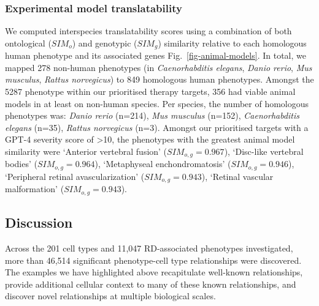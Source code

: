 \documentclass[
sn-nature
]{sn-jnl}
\begin{document}
\subsubsection{Experimental model
translatability}\label{experimental-model-translatability}

We computed interspecies translatability scores using a combination of
both ontological (\(SIM_{o}\)) and genotypic (\(SIM_{g}\)) similarity
relative to each homologous human phenotype and its associated genes
Fig.~\ref{fig-animal-models}. In total, we mapped 278 non-human
phenotypes (in \emph{Caenorhabditis elegans}, \emph{Danio rerio},
\emph{Mus musculus}, \emph{Rattus norvegicus}) to 849 homologous human
phenotypes. Amongst the 5287 phenotype within our prioritised therapy
targets, 356 had viable animal models in at least on non-human species.
Per species, the number of homologous phenotypes was: \emph{Danio rerio}
(n=214), \emph{Mus musculus} (n=152), \emph{Caenorhabditis elegans}
(n=35), \emph{Rattus norvegicus} (n=3). Amongst our prioritised targets
with a GPT-4 severity score of \textgreater10, the phenotypes with the
greatest animal model similarity were `Anterior vertebral fusion'
(\(SIM_{o,g}=0.967\)), `Disc-like vertebral bodies'
(\(SIM_{o,g}=0.964\)), `Metaphyseal enchondromatosis'
(\(SIM_{o,g}=0.946\)), `Peripheral retinal avascularization'
(\(SIM_{o,g}=0.943\)), `Retinal vascular malformation'
(\(SIM_{o,g}=0.943\)).

\subsection{Discussion}\label{sec-discussion}

Across the 201 cell types and 11,047 RD-associated phenotypes
investigated, more than 46,514 significant phenotype-cell type
relationships were discovered. The examples we have highlighted above
recapitulate well-known relationships, provide additional cellular
context to many of these known relationships, and discover novel
relationships at multiple biological scales.
\end{document}
